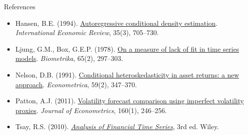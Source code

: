 \begin{frame}{References}
\begin{itemize}
    \item Hansen, B.E. (1994). \href{https://doi.org/10.2307/2527081}{Autoregressive conditional density estimation}. \textit{International Economic Review}, 35(3), 705--730.
    \item Ljung, G.M., Box, G.E.P. (1978). \href{https://doi.org/10.1093/biomet/65.2.297}{On a measure of lack of fit in time series models}. \textit{Biometrika}, 65(2), 297--303.
    \item Nelson, D.B. (1991). \href{https://doi.org/10.2307/2938260}{Conditional heteroskedasticity in asset returns: a new approach}. \textit{Econometrica}, 59(2), 347--370.
    \item Patton, A.J. (2011). \href{https://doi.org/10.1016/j.jeconom.2010.03.034}{Volatility forecast comparison using imperfect volatility proxies}. \textit{Journal of Econometrics}, 160(1), 246--256.
    \item Tsay, R.S. (2010). \href{https://doi.org/10.1002/9780470644560}{\textit{Analysis of Financial Time Series}}, 3rd ed. Wiley.
\end{itemize}
\end{frame}


